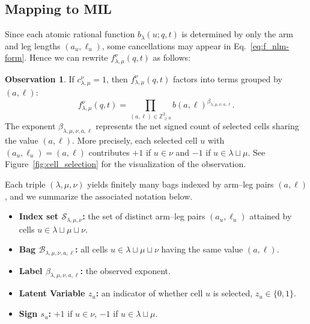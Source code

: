 \documentclass{article}
\theoremstyle{plain}
\theoremstyle{definition}
\newtheorem{observation}[theorem]{Observation}
\theoremstyle{remark}
\begin{document}
    \subsection{Mapping to MIL}
    Since each atomic rational function $b_\lambda(u;q,t)$ is determined by only
    the arm and leg lengths $(a_u, \ell_u)$, some cancellations may appear
    in Eq.~\eqref{eq:f_nlm-form}. Hence we can rewrite $f^\nu_{\lambda,\mu}(q,t)$ as follows:
	\begin{observation}
		If $c^{\nu}_{\lambda,\mu}=1$, then $f^\nu_{\lambda,\mu}(q,t)$ factors
        into terms grouped by $(a,\ell)$:
		\[ \label{eq:factored_f}
			f^{\nu}_{\lambda,\mu}(q,t) = \prod_{(a,\ell)\in \mathbb{Z}_{\ge 0}^2} b(a,\ell)^{\beta_{\lambda, \mu, \nu, a,\ell}}.
		\]
		The exponent $\beta_{\lambda, \mu, \nu, a,\ell}$ represents the net signed count of selected cells sharing the value $(a,\ell)$.
        More precisely, each selected cell $u$ with $(a_u,\ell_u)=(a,\ell)$ contributes $+1$ if $u\in\nu$ and $-1$ if $u\in\lambda\sqcup\mu$.
        See Figure~\ref{fig:cell_selection} for the visualization of the observation.
	\end{observation}
	
	Each triple $(\lambda,\mu,\nu)$ yields finitely many bags indexed by arm--leg pairs $(a,\ell)$, and we summarize the associated notation below.
	\begin{itemize}
    
            \item \textbf{Index set $\mathcal S_{\lambda,\mu,\nu}$:}
                the set of distinct arm--leg pairs $(a_u,\ell_u)$ attained by cells $u\in\lambda\sqcup\mu\sqcup\nu$.
            \item \textbf{Bag $\mathcal{B}_{\lambda, \mu, \nu, a,\ell}$:}
                all cells $u\in \lambda\sqcup\mu\sqcup\nu$ having the same value $(a,\ell)$.
		\item \textbf{Label $\beta_{\lambda,\mu,\nu,a,\ell}$:}
            the observed exponent.
		\item \textbf{Latent Variable $z_u$:}
            an indicator of whether cell $u$ is selected, $z_u\in\{0,1\}$.
		\item \textbf{Sign $s_u$:}
            $+1$ if $u \in \nu$, $-1$ if $u \in \lambda \sqcup \mu$.
	\end{itemize}
	
\end{document}
